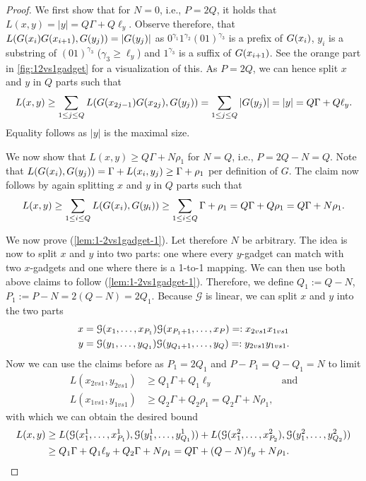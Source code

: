 \begin{proof}
We first show that for $N=0$, i.e., $P=2Q$, it holds that $L(x,y) = |y| = Q\Gamma + Q\ell_y$.
Observe therefore, that $L(G(x_i)G(x_{i+1}), G(y_j)) = |G(y_j)|$ as $0^{\gamma_1}1^{\gamma_2}(01)^{\gamma_3}$ is a prefix of $G(x_i)$, $y_i$ is a substring of $(01)^{\gamma_3}$ ($\gamma_3 \geq \ell_y$) and $1^{\gamma_3}$ is a suffix of $G(x_{i+1})$. See the orange part in \autoref{fig:12vs1gadget} for a visualization of this.
As $P = 2Q$, we can hence split $x$ and $y$ in $Q$ parts such that
\[
	L(x,y) \geq \sum_{1\leq j \leq Q} L(G(x_{2j-1})G(x_{2j}), G(y_j)) = \sum_{1\leq j \leq Q} |G(y_j)| = |y| = Q\Gamma + Q\ell_y.
\]
Equality follows as $|y|$ is the maximal \lcs{} size.

We now show that $L(x,y) \geq Q\Gamma + N\rho_1$ for $N=Q$, i.e., $P=2Q - N = Q$.
Note that $L(G(x_i), G(y_j)) = \Gamma + L(x_i, y_j) \geq \Gamma + \rho_1$ per definition of $G$.
The claim now follows by again splitting $x$ and $y$ in $Q$ parts such that
\[
	L(x,y) \geq \sum_{1\leq i \leq Q} L(G(x_i), G(y_i)) \geq \sum_{1 \leq i \leq Q} \Gamma + \rho_1 = Q\Gamma + Q\rho_1 = Q\Gamma + N\rho_1.
\]


We now prove (\ref{lem:1-2vs1gadget-1}).
Let therefore $N$ be arbitrary.
The idea is now to split $x$ and $y$ into two parts: one where every $y$-gadget can match with two $x$-gadgets and one where there is a 1-to-1 mapping.
We can then use both above claims to follow (\ref{lem:1-2vs1gadget-1}).
Therefore, we define $Q_1 := Q-N$, $P_1 := P-N = 2(Q-N) = 2Q_1$.
Because $\mathcal{G}$ is linear, we can split $x$ and $y$ into the two parts
\begin{align*}
x &= \lLCSGadget{x_1, \ldots, x_{P_1}}\lLCSGadget{x_{P_1+1}, \ldots, x_{P}} =: x_{2vs1}x_{1vs1} \\
%
y &= \lLCSGadget{y_1, \ldots, y_{Q_1}}\lLCSGadget{y_{Q_1+1}, \ldots, y_{Q}} =: y_{2vs1}y_{1vs1}.
\end{align*}
%
Now we can use the claims before as $P_1 = 2Q_1$ and $P - P_1 = Q - Q_1 = N$ to limit 
\begin{align*}
L(x_{2vs1}, y_{2vs1}) &\geq Q_1\Gamma + Q_1\ell_y %
& \text{and}\\
%
L(x_{1vs1}, y_{1vs1}) &\geq Q_2\Gamma + Q_2\rho_1 = Q_2\Gamma + N\rho_1, 
\end{align*}
with which we can obtain the desired bound
\begin{align*}
L(x,y) &\geq L(\mathcal{G}(x^1_1, \ldots, x^1_{P_1}), \mathcal{G}(y^1_1, \ldots, y^1_{Q_1})) + L(\mathcal{G}(x^2_1, \ldots, x^2_{P_2}), \mathcal{G}(y^2_1, \ldots, y^2_{Q_2})) \\
	&\geq Q_1\Gamma + Q_1\ell_y + Q_2\Gamma + N\rho_1 = Q\Gamma + (Q-N)\ell_y + N\rho_1.
\end{align*}



\end{proof}

